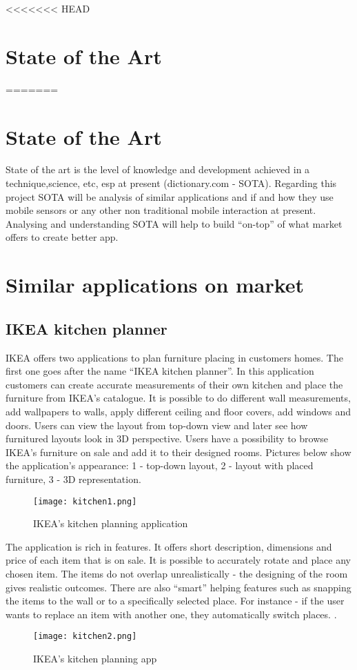 <<<<<<< HEAD
\section{State of the Art}
=======
\section{State of the Art}

State of the art is the level of knowledge and development achieved in a technique,science, etc, esp at present (dictionary.com - SOTA). Regarding this project SOTA will be analysis of similar applications and if and how they use mobile sensors or any other non traditional mobile interaction at present.  Analysing and understanding SOTA will help to build “on-top” of what market offers to create better app. 

\section{Similar applications on market} 
\subsection{IKEA kitchen planner}
IKEA offers two applications to plan furniture placing in customers homes. The first one goes after the name “IKEA kitchen planner”. In this application customers can create accurate measurements of their own kitchen and place the furniture from IKEA’s catalogue. It is possible to do different wall measurements, add wallpapers to walls, apply different ceiling and floor covers, add windows and doors. Users can view the layout from top-down view and later see how furnitured layouts look in 3D perspective.
Users have a possibility to browse IKEA’s furniture on sale and add it to their designed rooms.
Pictures below show the application’s appearance: 1 - top-down layout, 2 - layout with placed furniture, 3 - 3D representation.

\begin{figure}[H]
\centering
\texttt{[image: kitchen1.png]}
\caption{IKEA’s kitchen planning application}
\end{figure}


The application is rich in features. It offers short description, dimensions and price of each item that is on sale. It is possible to accurately rotate and place any chosen item. The items do not overlap unrealistically - the designing of the room gives realistic outcomes. There are also “smart” helping features such as snapping the items to the wall or to a specifically selected place. For instance - if the user wants to replace an item with another one, they automatically switch places.
.
\begin{figure}[H]
\centering
\texttt{[image: kitchen2.png]}
\caption{IKEA’s kitchen planning app}
\end{figure}

